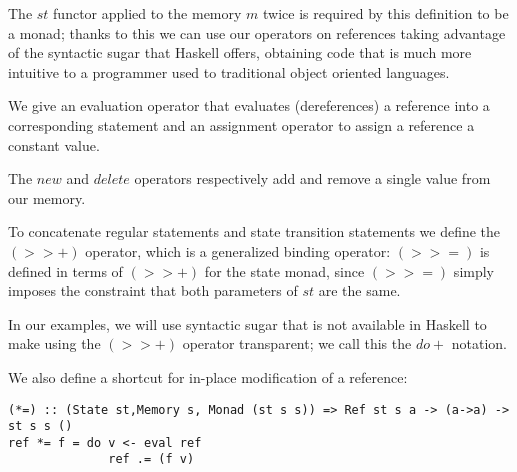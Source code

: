 The $st$ functor applied to the memory $m$ twice is required by this definition to be a monad; thanks to this we can use our operators on references taking advantage of the syntactic sugar that Haskell offers, obtaining code that is much more intuitive to a programmer used to traditional object oriented languages.

We give an evaluation operator that evaluates (dereferences) 
a reference into a corresponding statement and an assignment 
operator to assign a reference a constant value.

The $new$ and $delete$ operators respectively add and remove a single value from our memory.

To concatenate regular statements and state transition statements we define the $(>>+)$ operator, which is a generalized binding operator: $(>>=)$ is defined in terms of $(>>+)$ for the state monad, since $(>>=)$ simply imposes the constraint that both parameters of $st$ are the same.

In our examples, we will use syntactic sugar that is not available in Haskell to make using the $(>>+)$ operator transparent; we call this the $do+$ notation.

We also define a shortcut for in-place modification of a 
reference:
\begin{lstlisting}
(*=) :: (State st,Memory s, Monad (st s s)) => Ref st s a -> (a->a) -> st s s ()
ref *= f = do v <- eval ref
              ref .= (f v)
\end{lstlisting}
